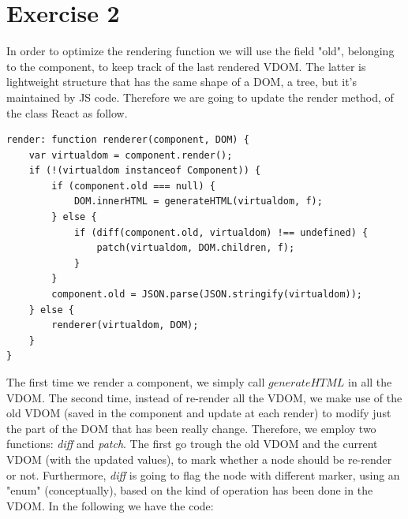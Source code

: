 \documentclass[10pt]{article}
\begin{document}
\section*{Exercise 2}
In order to optimize the rendering function we will use the field "old", belonging to the component, to keep track of the last rendered VDOM. The latter is lightweight structure that has the same shape of a DOM, a tree, but it's maintained by JS code. Therefore we are going to update the render method, of the class React as follow.   
\begin{lstlisting}[caption=New render method]
render: function renderer(component, DOM) {
    var virtualdom = component.render();
    if (!(virtualdom instanceof Component)) {
        if (component.old === null) {
            DOM.innerHTML = generateHTML(virtualdom, f);
        } else {
            if (diff(component.old, virtualdom) !== undefined) {
                patch(virtualdom, DOM.children, f);
            }
        }
        component.old = JSON.parse(JSON.stringify(virtualdom));
    } else {
        renderer(virtualdom, DOM);
    }
}
\end{lstlisting}
The first time we render a component, we simply call $generateHTML$ in all the VDOM. The second time, instead of re-render all the VDOM, we make use of the old VDOM (saved in the component and update at each render) to modify just the part of the DOM that has been really change. Therefore, we employ two functions: \textit{diff} and \textit{patch}. The first go trough the old VDOM and the current VDOM (with the updated values), to mark whether a node should be re-render or not. Furthermore, \textit{diff} is going to flag the node with different marker, using an "enum" (conceptually), based on the kind of operation has been done in the VDOM. In the following we have the code: 
\end{document}

